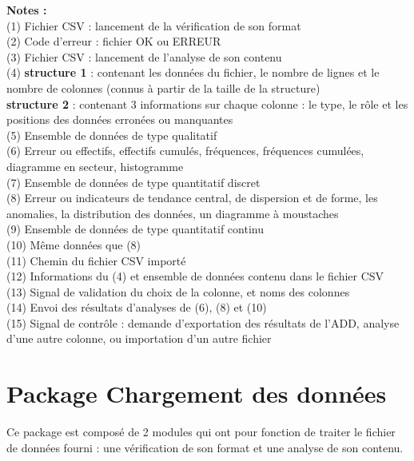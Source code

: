 		\textbf{Notes :}\\
		(1) Fichier CSV : lancement de la vérification de son format\\
		(2) Code d'erreur : fichier OK ou ERREUR\\
		(3) Fichier CSV : lancement de l'analyse de son contenu\\
		(4) \textbf{structure 1} : contenant les données du fichier, le nombre de lignes et le nombre de colonnes (connus à partir de la taille de la structure)\\
		\hspace*{1.5em} \textbf{structure 2} : contenant 3 informations sur chaque colonne : le type, le rôle et les positions des données erronées ou manquantes\\
		(5) Ensemble de données de type qualitatif\\
		(6) Erreur ou effectifs, effectifs cumulés, fréquences, fréquences cumulées, diagramme en secteur, histogramme\\
		(7) Ensemble de données de type quantitatif discret\\
		(8) Erreur ou indicateurs de tendance central, de dispersion et de forme, les anomalies, la distribution des données, un diagramme à moustaches\\
		(9) Ensemble de données de type quantitatif continu\\
		(10) Même données que (8)\\
		(11) Chemin du fichier CSV importé \\
		(12) Informations du (4) et ensemble de données contenu dans le fichier CSV \\
		(13) Signal de validation du choix de la colonne, et noms des colonnes\\
		(14) Envoi des résultats d'analyses de (6), (8) et (10)\\
		(15) Signal de contrôle : demande d'exportation des résultats de l'ADD, analyse d'une autre colonne, ou importation d'un autre fichier\\
		
	\section{Package Chargement des données}
	Ce package est composé de 2 modules qui ont pour fonction de traiter le fichier de données fourni : une vérification de son format et une analyse de son contenu.
		

